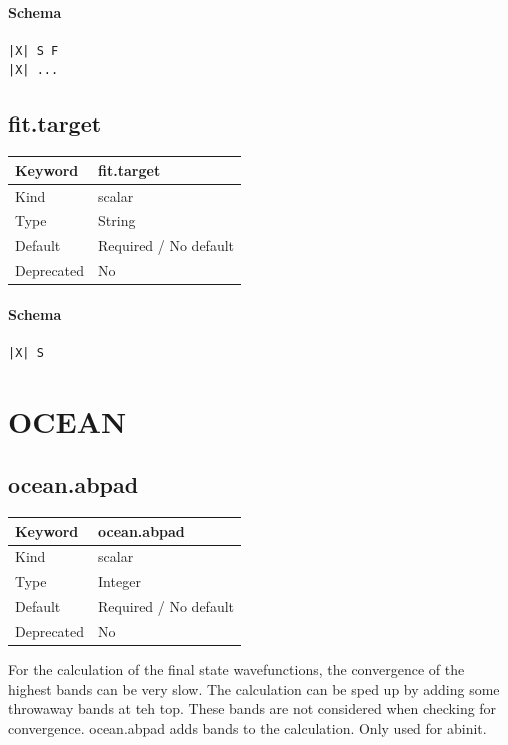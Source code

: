 \documentclass[11pt]{article}
\begin{document}
{{{{{\paragraph{Schema}
\begin{Verbatim}
|X| S F
|X| ...
\end{Verbatim}

\subsection{fit.target}
\label{kw:fit-target}
\begin{longtable}{|p{1.5in}|p{4.5in}|}
\hline
Keyword & fit.target \\
\hline
Kind & scalar \\
\hline
Type & String \\
\hline
Default & Required / No default \\
\hline
Deprecated & No \\
\hline
\end{longtable}
\paragraph{Schema}
\begin{Verbatim}
|X| S
\end{Verbatim}

\section{OCEAN}

\subsection{ocean.abpad}
\label{kw:ocean-abpad}
\begin{longtable}{|p{1.5in}|p{4.5in}|}
\hline
Keyword & ocean.abpad \\
\hline
Kind & scalar \\
\hline
Type & Integer \\
\hline
Default & Required / No default \\
\hline
Deprecated & No \\
\hline
\end{longtable}
 For the calculation of the final state wavefunctions, the convergence of the
 highest bands can be very slow. The calculation can be sped up by adding some
 throwaway bands at teh top. These bands are not considered when checking for convergence. ocean.abpad adds bands to the calculation. Only used for abinit.

}}}}}
\end{document}
